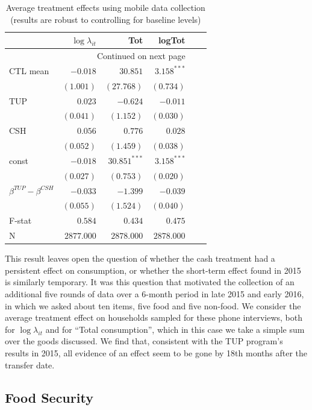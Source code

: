 \documentclass[12pt,article]{article}
\begin{document}
\newpage

\begin{longtable}{lrrrrr}
\caption{\label{tab:mobile_consumption}Average treatment effects using mobile data collection (results are robust to controlling for baseline levels)}
\\
\hline
 & $\log\lambda_{it}$ & Tot & logTot\\
\hline
\endhead
\hline\multicolumn{4}{r}{Continued on next page} \\
\endfoot
\endlastfoot
CTL mean & $-0.018$ & $30.851$ & $3.158^{***}$\\
 & $(1.001)$ & $(27.768)$ & $(0.734)$\\
\hline
TUP & $0.023$ & $-0.624$ & $-0.011$\\
 & $(0.041)$ & $(1.152)$ & $(0.030)$\\
CSH & $0.056$ & $0.776$ & $0.028$\\
 & $(0.052)$ & $(1.459)$ & $(0.038)$\\
const & $-0.018$ & $30.851^{***}$ & $3.158^{***}$\\
 & $(0.027)$ & $(0.753)$ & $(0.020)$\\
\hline
$\beta^{TUP}-\beta^{CSH}$ & $-0.033$ & $-1.399$ & $-0.039$\\
 & $(0.055)$ & $(1.524)$ & $(0.040)$\\
\hline
F-stat & $0.584$ & $0.434$ & $0.475$\\
N & $2877.000$ & $2878.000$ & $2878.000$\\
\hline
\end{longtable}


This result leaves open the question of whether the cash treatment had a persistent
effect on consumption, or whether the short-term effect found in 2015 is similarly
temporary. It was this question that motivated the collection of an additional five
rounds of data over a 6-month period in late 2015 and early 2016, in which we asked
about ten items, five food and five non-food. We consider the average treatment
effect on households sampled for these phone interviews, both for
\(\log\lambda_{it}\) and for ``Total consumption'', which in this case we take a simple
sum over the goods discussed. We find that, consistent with the TUP program's results
in 2015, all evidence of an effect seem to be gone by 18th months after the transfer
date.



\subsection*{Food Security}
\label{sec-3-4}
\end{document}
